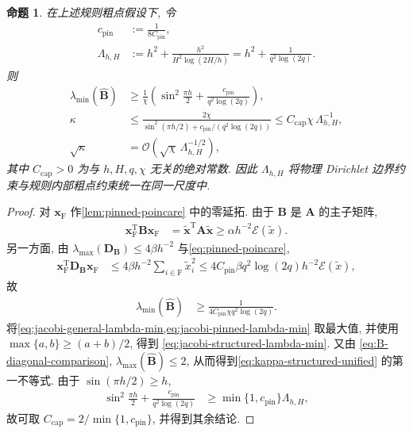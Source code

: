 \documentclass{ctexart}
\newcommand{\T}{\mathrm{T}}
\renewcommand{\O}{\mathcal{O}}
\newcommand{\ti}[1]{\widetilde{#1}}
\renewcommand{\ge}{\geqslant}
\renewcommand{\le}{\leqslant}
\newtheorem{proposition}[theorem]{命题}
\begin{document}
\begin{proposition}
\label{prop:structured-kappa}
在上述规则粗点假设下, 令
\begin{align}
    c_{\mathrm{pin}}&:=\frac1{8C_{\mathrm{pin}}},
    \label{eq:cpin-definition}\\
    \Lambda_{h,H}
    &:=
    h^2+\frac{h^2}{H^2\log(2H/h)}
     =
    h^2+\frac1{q^2\log(2q)}.
    \label{eq:boundary-capacity-scale}
\end{align}
则
\begin{align}
    \lambda_{\min}(\widehat{\bm B})
    &\ge\frac1\chi\left(
      \sin^2\frac{\pi h}{2}
      +\frac{c_{\mathrm{pin}}}{q^2\log(2q)}
    \right),
    \label{eq:jacobi-structured-lambda-min}\\
    \kappa
    &\le
    \frac{2\chi}{
      \sin^2(\pi h/2)+c_{\mathrm{pin}}/(q^2\log(2q))}
    \le
    C_{\mathrm{cap}}\chi\,\Lambda_{h,H}^{-1},
    \label{eq:kappa-structured-unified}\\
    \sqrt\kappa
    &=\O\left(
      \sqrt\chi\,\Lambda_{h,H}^{-1/2}
    \right),
    \label{eq:kappa-boundary-capacity-scale}
\end{align}
其中 $C_{\mathrm{cap}}>0$ 为与 $h,H,q,\chi$ 无关的绝对常数.
因此 $\Lambda_{h,H}$ 将物理 Dirichlet 边界约束与规则内部粗点约束统一在同一尺度中.
\end{proposition}

\begin{proof}
对 $\bm x_{\mathrm F}$ 作\cref{lem:pinned-poincare} 中的零延拓. 由于 $\bm B$ 是 $\bm A$ 的主子矩阵,
\begin{align}
    \bm x_{\mathrm F}^\T\bm B\bm x_{\mathrm F}
    &=\ti{\bm x}^\T\bm A\ti{\bm x}
     \ge\alpha h^{-2}\mathcal E(\ti x).
    \label{eq:B-energy-pinned-lower}
\end{align}
另一方面, 由 $\lambda_{\max}(\bm D_{\bm B})\le4\beta h^{-2}$ 与\cref{eq:pinned-poincare},
\begin{align}
    \bm x_{\mathrm F}^\T\bm D_{\bm B}\bm x_{\mathrm F}
    &\le4\beta h^{-2}\sum_{i\in\mathrm F}\ti x_i^2
     \le4C_{\mathrm{pin}}\beta q^2\log(2q)h^{-2}\mathcal E(\ti x),
    \label{eq:D-energy-pinned-upper}
\end{align}
故
\begin{align}
    \lambda_{\min}(\widehat{\bm B})
    &\ge\frac1{4C_{\mathrm{pin}}\chi q^2\log(2q)}.
    \label{eq:jacobi-pinned-lambda-min}
\end{align}
将\cref{eq:jacobi-general-lambda-min,eq:jacobi-pinned-lambda-min} 取最大值,
并使用 $\max\{a,b\}\ge(a+b)/2$, 得到
\cref{eq:jacobi-structured-lambda-min}. 又由
\cref{eq:B-diagonal-comparison},
$\lambda_{\max}(\widehat{\bm B})\le2$,
从而得到\cref{eq:kappa-structured-unified} 的第一不等式.
由于 $\sin(\pi h/2)\ge h$,
\begin{align}
    \sin^2\frac{\pi h}{2}
    +\frac{c_{\mathrm{pin}}}{q^2\log(2q)}
    &\ge
    \min\{1,c_{\mathrm{pin}}\}
    \Lambda_{h,H},
    \label{eq:capacity-denominator-comparison}
\end{align}
故可取
$C_{\mathrm{cap}}=2/\min\{1,c_{\mathrm{pin}}\}$,
并得到其余结论.
\end{proof}
\end{document}
